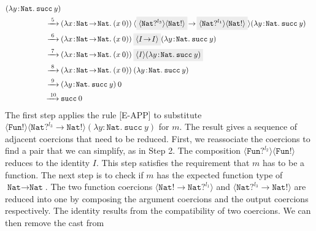 \begin{align*}
    (\lambda y \! : \! \texttt{Nat} . \: \texttt{succ} \: y) \\
    \xrightarrow{\text{ 5 }} \:
    & (\lambda x \! : \! \texttt{Nat} \! \rightarrow \! \texttt{Nat} . \: 
    (x \: 0)) \: \langle \highlight{\langle \texttt{Nat}? ^{l_3} \rangle \langle \texttt{Nat}! \rangle} \! \rightarrow \! 
    \highlight{\langle \texttt{Nat}? ^{l_1} \rangle \langle \texttt{Nat}! \rangle} \rangle
    (\lambda y \! : \! \texttt{Nat} . \: \texttt{succ} \: y) \\
    \xrightarrow{\text{ 6 }} \:
    & (\lambda x \! : \! \texttt{Nat} \! \rightarrow \! \texttt{Nat} . \: 
    (x \: 0)) \: \highlight{\langle I \! \rightarrow \! I \rangle}
    (\lambda y \! : \! \texttt{Nat} . \: \texttt{succ} \: y) \\
    \xrightarrow{\text{ 7 }} \:
    & (\lambda x \! : \! \texttt{Nat} \! \rightarrow \! \texttt{Nat} . \: 
    (x \: 0)) \: \highlight{\langle I \rangle
    (\lambda y \! : \! \texttt{Nat} . \: \texttt{succ} \: y)} \\
    \xrightarrow{\text{ 8 }} \:
    & (\lambda x \! : \! \texttt{Nat} \! \rightarrow \! \texttt{Nat} . \: 
    (x \: 0)) \: 
    (\lambda y \! : \! \texttt{Nat} . \: \texttt{succ} \: y) \\
    \xrightarrow{\text{ 9 }} \:
    & (\lambda y \! : \! \texttt{Nat} . \: \texttt{succ} \: y) \: 0 \\
    \xrightarrow{\text{ 10}} \:
    & \texttt{succ} \: 0
\end{align*}
The first step applies the rule {\scriptsize{[E-APP]}} to substitute 
$\langle \texttt{Fun}! \rangle \langle \texttt{Nat}? ^{l_3} \! \rightarrow \! \texttt{Nat}! \rangle 
(\lambda y \! : \! \texttt{Nat} . \: \texttt{succ} \: y)$ for $m$. The result gives 
a sequence of adjacent coercions that need to be reduced. First, we reassociate the coercions 
to find a pair that we can simplify, as in Step 2. The composition $\langle \texttt{Fun}? ^{l_2} \rangle 
\langle \texttt{Fun}! \rangle$ reduces to the identity $I$. This step satisfies the requirement that 
$m$ has to be a function. The next step is to check if $m$ has the expected function type of 
$\texttt{Nat} \! \rightarrow \! \texttt{Nat}$. The two function coercions $\langle \texttt{Nat}! \! 
\rightarrow \! \texttt{Nat}? ^{l_1} \rangle$ and $\langle \texttt{Nat}? ^{l_3} \! \rightarrow \! \texttt{Nat}! \rangle$ 
are reduced into one by composing the argument coercions and the output coercions respectively. The 
identity results from the compatibility of two coercions. We can then remove the cast from  
